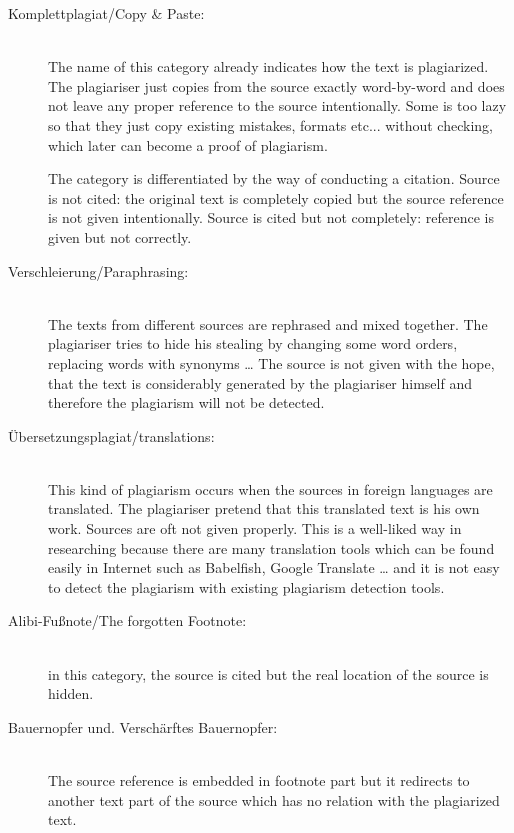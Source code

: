 \begin{description}
\item[Komplettplagiat/Copy \& Paste:] \hfill \\
The name of this category already indicates how the text is plagiarized. The 
plagiariser just copies from the source exactly word-by-word and does not leave any proper reference to the source 
intentionally. Some is too lazy so that they just copy existing mistakes, formats etc... without checking, which 
later can become a proof of plagiarism.

The category is differentiated by the way of conducting a citation.
Source is not cited: the original text is completely copied but the source reference is not given intentionally.
Source is cited but not completely: reference is given but not correctly.  

\item[Verschleierung/Paraphrasing:]  \hfill \\
The texts from different sources are rephrased and mixed together. The plagiariser tries 
to hide his stealing by changing some word orders, replacing words with synonyms … The source is not given with the hope, 
that the text is considerably generated by the plagiariser himself and therefore the plagiarism will not be detected.

\item[Übersetzungsplagiat/translations:] \hfill \\
This kind of plagiarism occurs when the sources in foreign languages are translated. 
The plagiariser pretend that this translated text is his own work. Sources are oft not given properly. This is a 
well-liked way in researching because there are many translation tools which can be found easily in Internet such as 
Babelfish, Google Translate … and  it is not easy to detect the plagiarism with existing plagiarism detection tools.

\item[Alibi-Fußnote/The forgotten Footnote:] \hfill \\
in this category, the source is cited but the real location of the source is 
hidden.  

\item[Bauernopfer und. Verschärftes Bauernopfer:] \hfill \\
The source reference is embedded in footnote part but it redirects to 
another text part of the source which has no relation with the plagiarized text.
\end{description}

